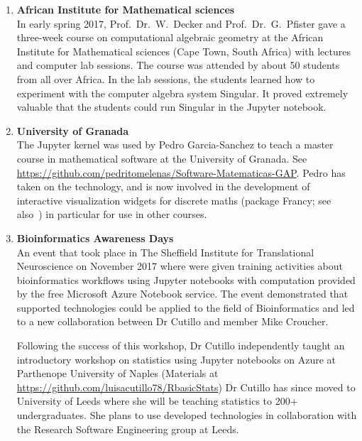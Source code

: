 \begin{enumerate}
\item \textbf{African Institute for Mathematical sciences}\\
  In early spring 2017, Prof.~Dr.~W.~Decker and Prof.~Dr.~G.~Pfister
  gave a three-week course on computational algebraic geometry at the
  African Institute for Mathematical sciences (Cape Town, South
  Africa) with lectures and computer lab sessions. The course was
  attended by about 50 students from all over Africa. In the lab
  sessions, the students learned how to experiment with the computer
  algebra system Singular. It proved extremely valuable that the
  students could run Singular in the Jupyter notebook.


\item \textbf{University of Granada}\\
  The \GAP Jupyter kernel was used by Pedro Garcia-Sanchez to teach a
  master course in mathematical software at the University of Granada.
  See
  \url{https://github.com/pedritomelenas/Software-Matematicas-GAP}.
  Pedro has taken on the technology, and is now involved in the
  development of interactive visualization widgets for discrete maths
  (package Francy; see
  also~) in particular
  for use in other courses.

\item \textbf{ Bioinformatics Awareness Days}\\
An event that took place in The Sheffield Institute for Translational Neuroscience on November 2017 where were given training activities
about bioinformatics workflows using Jupyter notebooks with
computation provided by the free Microsoft Azure Notebook service. The event
demonstrated that \ODK supported technologies could be applied to the field of Bioinformatics and led to a new collaboration between Dr
Cutillo and \ODK member Mike Croucher.

Following the success of this workshop, Dr Cutillo independently taught an introductory workshop on statistics using Jupyter notebooks
on Azure at Parthenope University of Naples (Materials at \url{https://github.com/luisacutillo78/RbasicStats}) Dr Cutillo has since moved
to University of Leeds where she will be teaching statistics to 200+ undergraduates. She plans to use \ODK developed technologies
in collaboration with the Research Software Engineering group at Leeds.


\end{enumerate}
